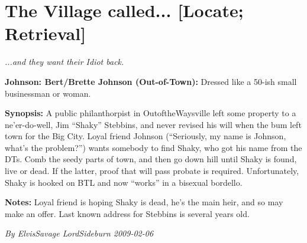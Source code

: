 \documentclass[letterpaper,twocolumn,10.5pt]{article}
\newenvironment{scenario}[6]
	{
		\section{#1 {\small[#2]}}
		\textit{#3}
		\def\TMPSCENARIO{#4 #5}
	}
	{\small\textit{By \TMPSCENARIO}}
\newcommand{\johnson}[2]{\textbf{Johnson: #1 (#2):}}
\newcommand{\synopsis}{\textbf{Synopsis: }}
\newcommand{\notes}{\textbf{Notes: }}
\begin{document}
\begin{scenario}{The Village called...}
	{Locate; Retrieval}
	{...and they want their Idiot back.}
	{ElvisSavage LordSideburn}
	{2009-02-06}
	{https://forum.rpg.net/showthread.php?321504-Shadowrun-4th-101-Instant-Scenarios\&p=9945478#post9945478}

\johnson{Bert/Brette Johnson}{Out-of-Town} Dressed like a 50-ish small businessman or woman.

\synopsis A public philanthorpist in OutoftheWaysville left some property to a ne'er-do-well, Jim ``Shaky'' Stebbins, and never revised his will when the bum left town for the Big City. Loyal friend Johnson (``Seriously, my name is Johnson, what's the problem?'') wants somebody to find Shaky, who got his name from the DTs. Comb the seedy parts of town, and then go down hill until Shaky is found, live or dead. If the latter, proof that will pass probate is required. Unfortunately, Shaky is hooked on BTL and now ``works'' in a bisexual bordello.

\notes Loyal friend is hoping Shaky is dead, he's the main heir, and so may make an offer. Last known address for Stebbins is several years old. 

\end{scenario}
\end{document}
